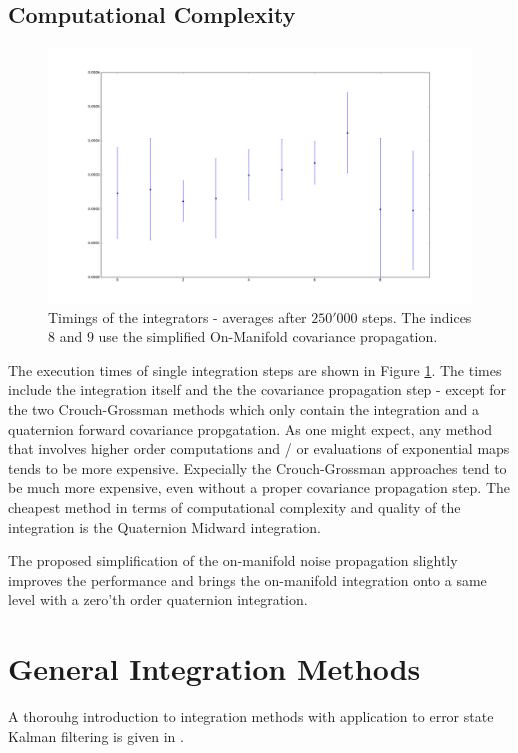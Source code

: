 \documentclass[10pt,a4paper]{article}
\numberwithin{equation}{section}
\begin{document}
\subsection{Computational Complexity}

\begin{figure}
\includegraphics[width=14cm]{figures/integrator_timings.pdf}
\caption{Timings of the integrators - averages after $250'000$ steps. The indices $8$ and $9$ use the simplified On-Manifold covariance propagation.}
\label{fig:integration_timings}
\end{figure}	

The execution times of single integration steps are shown in Figure \ref{fig:integration_timings}. The times include the integration itself and the the covariance propagation step - except for the two Crouch-Grossman methods which only contain the integration and a quaternion forward covariance propgatation.
As one might expect, any method that involves higher order computations and / or evaluations of exponential maps tends to be more expensive. Expecially the Crouch-Grossman approaches tend to be much more expensive, even without a proper covariance propagation step. The cheapest method in terms of computational complexity and quality of the integration is the Quaternion Midward integration.

The proposed simplification of the on-manifold noise propagation slightly improves the performance and brings the on-manifold integration onto a same level with a zero'th order quaternion integration.

\section{General Integration Methods}
A thorouhg introduction to integration methods with application to error state Kalman filtering is given in \cite{joan_sola}.
\end{document}
